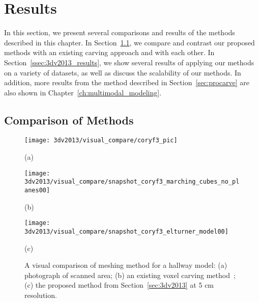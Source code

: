 \documentclass[12pt,onecolumn,oneside]{book}
\begin{document}
\section{Results}
\label{sec:carving_results}

In this section, we present several comparisons and results of the methods described in this chapter.  In Section~\ref{ssec:compare_3dv2013_procarve}, we compare and contrast our proposed methods with an existing carving approach and with each other.  In Section~\ref{ssec:3dv2013_results}, we show several results of applying our methods on a variety of datasets, as well as discuss the scalability of our methods.  In addition, more results from the method described in Section~\ref{sec:procarve} are also shown in Chapter~\ref{ch:multimodal_modeling}.

\subsection{Comparison of Methods}
\label{ssec:compare_3dv2013_procarve}

\begin{figure}[p]
	
	\centering
	\begin{minipage}[b]{0.55\linewidth}
	\centerline{\texttt{[image: 3dv2013/visual\_compare/coryf3\_pic]}}
	\centerline{(a)}\medskip
	\end{minipage}
	\hfill
	\begin{minipage}[b]{0.55\linewidth}
	\centerline{\texttt{[image: 3dv2013/visual\_compare/snapshot\_coryf3\_marching\_cubes\_no\_planes00]}}
	\centerline{(b)}\medskip
	\end{minipage}
	\hfill
	\begin{minipage}[b]{0.55\linewidth}
	\centerline{\texttt{[image: 3dv2013/visual\_compare/snapshot\_coryf3\_elturner\_model00]}}
	\centerline{(c)}\medskip
	\end{minipage}

	\caption[Comparison between voxel carving methods.]{A visual comparison of meshing method for a hallway model:  (a) photograph of scanned area; (b) an existing voxel carving method~\cite{Carving}; (c) the proposed method from Section~\ref{sec:3dv2013} at 5 cm resolution.}
	\label{fig:mc_compare}

\end{figure}
\end{document}
